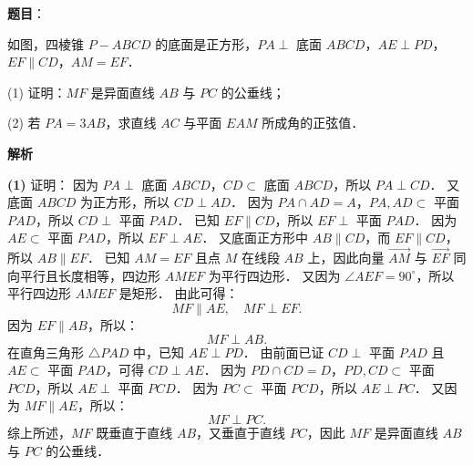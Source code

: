 \begin{answer}

\textbf{题目}：

如图，四棱锥 $P - ABCD$ 的底面是正方形，$PA \perp$ 底面 $ABCD$，$AE \perp PD$，$EF \parallel CD$，$AM = EF$．
\nopagebreak[4]
\begin{center}\end{center}
\nopagebreak[4]
(1) 证明：$MF$ 是异面直线 $AB$ 与 $PC$ 的公垂线；

(2) 若 $PA = 3AB$，求直线 $AC$ 与平面 $EAM$ 所成角的正弦值．

\textbf{解析}
\nopagebreak[4]
\begin{center}\end{center}
\nopagebreak[4]
\textbf{(1)} 证明：
因为 $PA \perp$ 底面 $ABCD$，$CD \subset$ 底面 $ABCD$，所以 $PA \perp CD$．
又底面 $ABCD$ 为正方形，所以 $CD \perp AD$．
因为 $PA \cap AD = A$，$PA, AD \subset$ 平面 $PAD$，所以 $CD \perp$ 平面 $PAD$．
已知 $EF \parallel CD$，所以 $EF \perp$ 平面 $PAD$．
因为 $AE \subset$ 平面 $PAD$，所以 $EF \perp AE$．
又底面正方形中 $AB \parallel CD$，而 $EF \parallel CD$，所以 $AB \parallel EF$．
已知 $AM = EF$ 且点 $M$ 在线段 $AB$ 上，因此向量 $\overrightarrow{AM}$ 与 $\overrightarrow{EF}$ 同向平行且长度相等，四边形 $AMEF$ 为平行四边形．
又因为 $\angle AEF = 90^\circ$，所以平行四边形 $AMEF$ 是矩形．
由此可得：
\nopagebreak[4]
\[
MF \parallel AE, \quad MF \perp EF.
\]
因为 $EF \parallel AB$，所以：
\nopagebreak[4]
\[
MF \perp AB.
\]
在直角三角形 $\triangle PAD$ 中，已知 $AE \perp PD$．
由前面已证 $CD \perp$ 平面 $PAD$ 且 $AE \subset$ 平面 $PAD$，可得 $CD \perp AE$．
因为 $PD \cap CD = D$，$PD, CD \subset$ 平面 $PCD$，所以 $AE \perp$ 平面 $PCD$．
因为 $PC \subset$ 平面 $PCD$，所以 $AE \perp PC$．
又因为 $MF \parallel AE$，所以：
\nopagebreak[4]
\[
MF \perp PC.
\]
综上所述，$MF$ 既垂直于直线 $AB$，又垂直于直线 $PC$，因此 $MF$ 是异面直线 $AB$ 与 $PC$ 的公垂线．


\end{answer}
